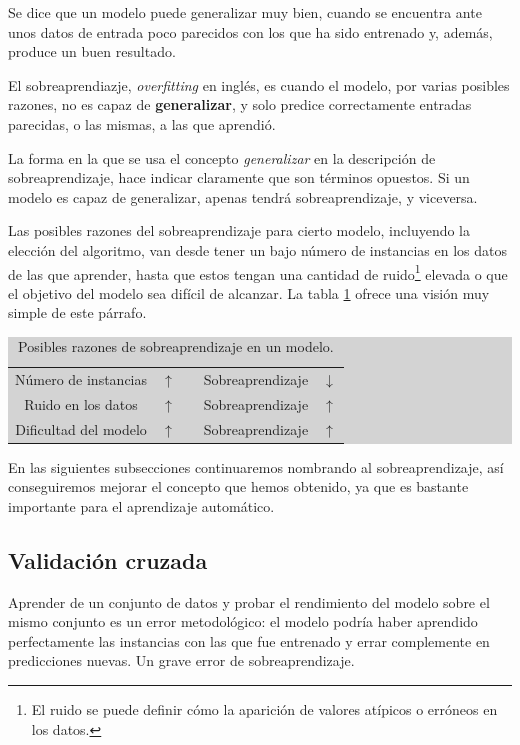 Se dice que un modelo puede generalizar muy bien, cuando se encuentra ante unos datos de entrada poco parecidos con los que ha sido entrenado y, además, produce un buen resultado.

El sobreaprendiazje, \emph{overfitting} en inglés, es cuando el modelo, por varias posibles razones, no es capaz de \textbf{generalizar}, y solo predice correctamente entradas parecidas, o las mismas, a las que aprendió.

La forma en la que se usa el concepto \emph{generalizar} en la descripción de sobreaprendizaje, hace indicar claramente que son términos opuestos. Si un modelo es capaz de generalizar, apenas tendrá sobreaprendizaje, y viceversa.

Las posibles razones del sobreaprendizaje para cierto modelo, incluyendo la elección del algoritmo, van desde tener un bajo número de instancias en los datos de las que aprender, hasta que estos tengan una cantidad de ruido\footnote{El ruido se puede definir cómo la aparición de valores atípicos o erróneos en los datos.} elevada o que el objetivo del modelo sea difícil de alcanzar. La tabla \ref{table:3.1} ofrece una visión muy simple de este párrafo.

\begin{table}[H]
\centering
\colorbox{lightgray}{\begin{tabular}{*{5}{c}}
  Número de instancias & $\uparrow$ & \; & Sobreaprendizaje & $\downarrow$ \\
  Ruido en los datos & $\uparrow$ & \; & Sobreaprendizaje & $\uparrow$ \\
  Dificultad del modelo & $\uparrow$ & \; & Sobreaprendizaje & $\uparrow$
\end{tabular}}
\caption{Posibles razones de sobreaprendizaje en un modelo.}
\label{table:3.1}
\end{table}

En las siguientes subsecciones continuaremos nombrando al sobreaprendizaje, así conseguiremos mejorar el concepto que hemos obtenido, ya que es bastante importante para el aprendizaje automático.

\subsection{Validación cruzada} \label{subsec:3.2.2}

Aprender de un conjunto de datos y probar el rendimiento del modelo sobre el mismo conjunto es un error metodológico: el modelo podría haber aprendido perfectamente las instancias con las que fue entrenado y errar complemente en predicciones nuevas. Un grave error de sobreaprendizaje.

